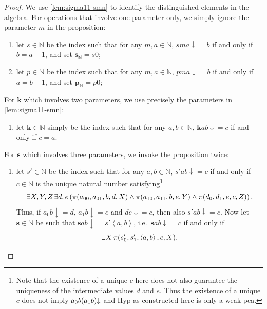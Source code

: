 \documentclass[12pt,openany]{book}
\theoremstyle{plain}
\theoremstyle{definition}
\newcommand\uplabel[1]{\textup{(#1)}}
\newcommand\tuple[1]{\left\langle #1 \right\rangle}
\newcommand\opE[1]{\mathop{\exists #1}}
\newcommand\Hyp{\mathrm{Hyp}}
\newcommand\bk{\mathbf{k}}
\newcommand\bs{\mathbf{s}}
\newcommand\bsN{\mathbf{s}_\mathbb{N}}
\newcommand\bpN{\mathbf{p}_\mathbb{N}}
\begin{document}
\begin{proof}
  We use \autoref{lem:sigma11-smn} to identify the distinguished elements in the algebra. For operations that involve one parameter only, we simply ignore the parameter $m$ in the proposition:
  \begin{enumerate}[label=\uplabel{\roman*}]
    \item let $s \in \mathbb{N}$ be the index such that for any $m, a \in \mathbb{N}$, $sma {\downarrow} = b$ if and only if $b = a + 1$, and set $\bsN = s0$;
    \item let $p \in \mathbb{N}$ be the index such that for any $m, a \in \mathbb{N}$, $pma {\downarrow} = b$ if and only if $a = b + 1$, and set $\bpN = p0$;
  \end{enumerate}

  For $\bk$ which involves two parameters, we use precisely the parameters in \autoref{lem:sigma11-smn}:
  \begin{enumerate}[label=\uplabel{\roman*},resume]
    \item let $\bk \in \mathbb{N}$ simply be the index such that for any $a, b \in \mathbb{N}$, $\bk ab {\downarrow} = c$ if and only if $c = a$.
  \end{enumerate}

  For $\bs$ which involves three parameters, we invoke the proposition twice:
  \begin{enumerate}[label=\uplabel{\roman*},resume]
    \item let $s' \in \mathbb{N}$ be the index such that for any $a, b \in \mathbb{N}$, $s' ab {\downarrow} = c$ if and only if $c \in \mathbb{N}$ is the unique natural number satisfying\footnote{Note that the existence of a unique $c$ here does not also guarantee the uniqueness of the intermediate values $d$ and $e$. Thus the existence of a unique $c$ does not imply $a_0 b \mleft(a_1 b\mright) {\downarrow}$ and $\Hyp$ as constructed here is only a weak pca.}
          \[\opE{X, Y, Z} \opE{d, e} \left(\pi\mleft(a_{00}, a_{01}, b, d, X\mright) \land \pi\mleft(a_{10}, a_{11}, b, e, Y\mright) \land \pi\mleft(d_0, d_1, e, c, Z\mright)\right).\]
          Thus, if $a_0 b {\downarrow} = d$, $a_1 b {\downarrow} = e$ and $de {\downarrow} = c$, then also $s' ab {\downarrow} = c$. Now let $\bs \in \mathbb{N}$ be such that $\bs ab {\downarrow} = s' \tuple{a, b}$, i.e.\ $\bs ab {\downarrow} = c$ if and only if
          \[\opE{X} \pi\mleft(s'_0, s'_1, \tuple{a, b}, c, X\mright).\]
  \end{enumerate}


\end{proof}
\end{document}
